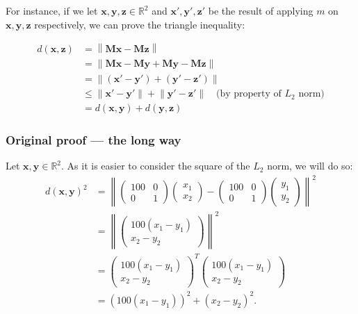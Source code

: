 \documentclass{article}
\newcommand{\vect}[1]{\ensuremath{\boldsymbol{\mathbf{#1}}}\xspace}
\begin{document}
For instance, if we let $\vect{x},\vect{y},\vect{z} \in \mathbb{R}^2$ and $\vect{x'},\vect{y'},\vect{z'}$ be the result of applying $m$ on $\vect{x},\vect{y},\vect{z}$ respectively, we can prove the triangle inequality:

\begin{align}
\nonumber d(\vect{x},\vect{z}) &= \left\|\vect{M}\vect{x} - \vect{M}\vect{z}\right\|\\
\nonumber &= \left\|\vect{M}\vect{x} - \vect{M}\vect{y} + \vect{M}\vect{y} - \vect{M}\vect{z}\right\|\\
\nonumber &= \left\|(\vect{x'} - \vect{y'}) + (\vect{y'} - \vect{z'})\right\|\\
\nonumber &\leq \left\|\vect{x'} - \vect{y'}\right\| + \left\|\vect{y'} - \vect{z'}\right\|\quad \text{(by property of } L_2 \text{ norm)}\\
  &= d(\vect{x},\vect{y}) + d(\vect{y},\vect{z})
\end{align}

\subsubsection{Original proof --- the long way}

Let $\vect{x}, \vect{y} \in \mathbb{R}^2$. As it is easier to consider
the square of the $L_2$ norm, we will do so:
\begin{align}
\nonumber  d(\vect{x},\vect{y})^2 &= \left\|\begin{pmatrix} 100 & 0\\ 0 & 1\end{pmatrix}\begin{pmatrix}x_1\\ x_2\end{pmatrix} - \begin{pmatrix}100 & 0\\ 0 & 1\end{pmatrix}\begin{pmatrix}y_1\\ y_2\end{pmatrix}\right\|^2 \\
      \nonumber &= \left\| \begin{pmatrix} 100(x_1 - y_1)\\ x_2 - y_2\end{pmatrix}\right\|^2\\
\nonumber          &= \begin{pmatrix} 100(x_1 - y_1)\\ x_2 - y_2\end{pmatrix}^T\begin{pmatrix} 100(x_1 - y_1)\\ x_2 - y_2\end{pmatrix}\\
            &= (100(x_1 - y_1))^2 + (x_2 - y_2)^2 \label{eq:c1}.
\end{align}
\end{document}
